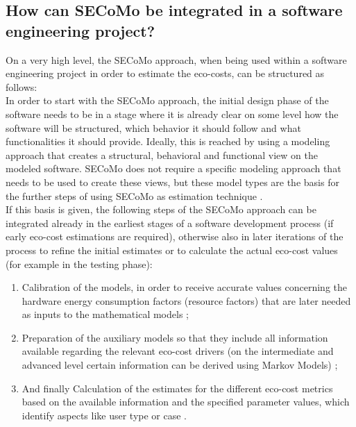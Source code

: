 \documentclass[oribibl]{llncs}
\begin{document}
\subsection{How can SECoMo be integrated in a software engineering project?}
On a very high level, the SECoMo approach, when being used within a software engineering project in order to estimate the eco-costs, can be structured as follows:\\
In order to start with the SECoMo approach, the initial design phase of the software needs to be in a stage where it is already clear on some level how the software will be structured, which behavior it should follow and what functionalities it should provide. %
Ideally, this is reached by using a modeling approach that creates a structural, behavioral and functional view on the modeled software. SECoMo does not require a specific modeling approach that needs to be used to create these views, but these model types are the basis for the further steps of using SECoMo as estimation technique \cite{schulze_cost_2016}.\\
If this basis is given, the following steps of the SECoMo approach can be integrated already in the earliest stages of a software development process (if early eco-cost estimations are required), otherwise also in later iterations of the process to refine the initial estimates or to calculate the actual eco-cost values (for example in the testing phase):
\begin{enumerate}
	\item Calibration of the models, in order to receive accurate values concerning the hardware energy consumption factors (resource factors) that are later needed as inputs to the mathematical models \cite{schulze_cost_2016}; %
	\item Preparation of the auxiliary models so that they include all information available regarding the relevant eco-cost drivers (on the intermediate and advanced level certain information can be derived using Markov Models) \cite{schulze_cost_2016}; %
	\item And finally Calculation of the estimates for the different eco-cost metrics based on the available information %
	and the specified parameter values, which identify aspects like user type or case \cite{schulze_cost_2016}.
\end{enumerate}
\end{document}
